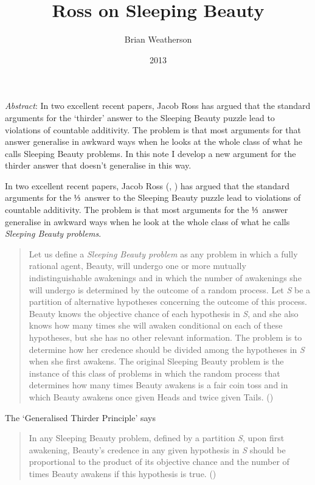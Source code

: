 \documentclass[
  11pt,
  letterpaper,
  DIV=11,
  numbers=noendperiod,
  twoside]{scrartcl}
\title{Ross on Sleeping Beauty}
\author{Brian Weatherson}
\date{2013}
\renewenvironment{abstract}
 {\vspace{-1.25cm}
 \quotation\small\noindent\emph{Abstract}:}
 {\endquotation}
\begin{document}
\maketitle
\begin{abstract}
In two excellent recent papers, Jacob Ross has argued that the standard
arguments for the `thirder' answer to the Sleeping Beauty puzzle lead to
violations of countable additivity. The problem is that most arguments
for that answer generalise in awkward ways when he looks at the whole
class of what he calls Sleeping Beauty problems. In this note I develop
a new argument for the thirder answer that doesn't generalise in this
way.
\end{abstract}


In two excellent recent papers, Jacob Ross
(, ) has
argued that the standard arguments for the ⅓~answer to the Sleeping
Beauty puzzle lead to violations of countable additivity. The problem is
that most arguments for the ⅓~answer generalise in awkward ways when he
look at the whole class of what he calls \emph{Sleeping Beauty
problems}.

\begin{quote}
Let us define a \emph{Sleeping Beauty problem} as any problem in which a
fully rational agent, Beauty, will undergo one or more mutually
indistinguishable awakenings and in which the number of awakenings she
will undergo is determined by the outcome of a random process. Let
\emph{S} be a partition of alternative hypotheses concerning the outcome
of this process. Beauty knows the objective chance of each hypothesis in
\emph{S}, and she also knows how many times she will awaken conditional
on each of these hypotheses, but she has no other relevant information.
The problem is to determine how her credence should be divided among the
hypotheses in \emph{S} when she first awakens. The original Sleeping
Beauty problem is the instance of this class of problems in which the
random process that determines how many times Beauty awakens is a fair
coin toss and in which Beauty awakens once given Heads and twice given
Tails. ()
\end{quote}

The `Generalised Thirder Principle' says

\begin{quote}
In any Sleeping Beauty problem, defined by a partition \emph{S}, upon
first awakening, Beauty's credence in any given hypothesis in \emph{S}
should be proportional to the product of its objective chance and the
number of times Beauty awakens if this hypothesis is true.
()
\end{quote}
\end{document}
